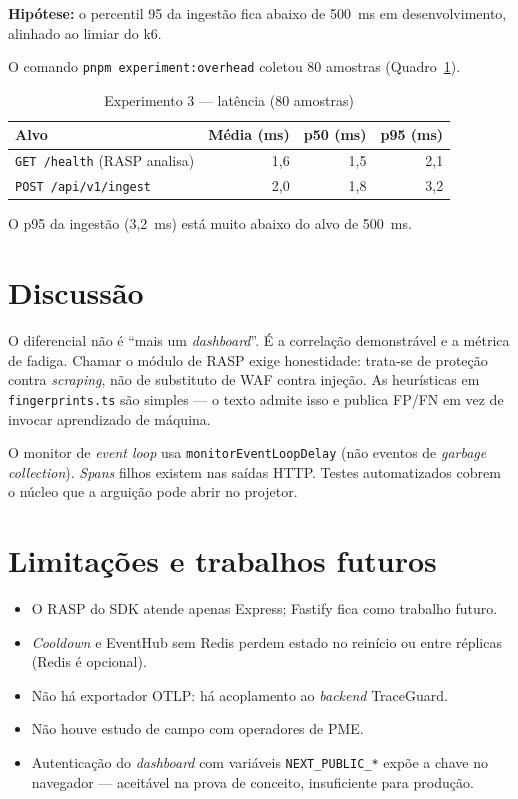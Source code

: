 \documentclass[
  12pt,
  oneside,
  a4paper,
  english,
  brazil,
  sumario=tradicional
]{abntex2}
\begin{document}
\textbf{Hipótese:} o percentil 95 da ingestão fica abaixo de 500~ms em desenvolvimento, alinhado ao limiar do k6.

O comando \texttt{pnpm experiment:overhead} coletou 80 amostras (Quadro~\ref{tab:overhead}).

\begin{table}[htbp]
\caption{Experimento 3 --- latência (80 amostras)}
\label{tab:overhead}
\centering
\begin{tabular}{@{}lrrr@{}}
\toprule
\textbf{Alvo} & \textbf{Média (ms)} & \textbf{p50 (ms)} & \textbf{p95 (ms)} \\
\midrule
\texttt{GET /health} (RASP analisa) & 1,6 & 1,5 & 2,1 \\
\texttt{POST /api/v1/ingest} & 2,0 & 1,8 & 3,2 \\
\bottomrule
\end{tabular}
\end{table}

O p95 da ingestão (3,2~ms) está muito abaixo do alvo de 500~ms.

\chapter{Discussão}

O diferencial não é ``mais um \textit{dashboard}''. É a correlação demonstrável e a métrica de fadiga. Chamar o módulo de RASP exige honestidade: trata-se de proteção contra \textit{scraping}, não de substituto de WAF contra injeção. As heurísticas em \texttt{fingerprints.ts} são simples --- o texto admite isso e publica FP/FN em vez de invocar aprendizado de máquina.

O monitor de \textit{event loop} usa \texttt{monitorEventLoopDelay} (não eventos de \textit{garbage collection}). \textit{Spans} filhos existem nas saídas HTTP. Testes automatizados cobrem o núcleo que a arguição pode abrir no projetor.

\chapter{Limitações e trabalhos futuros}

\begin{itemize}
  \item O RASP do SDK atende apenas Express; Fastify fica como trabalho futuro.
  \item \textit{Cooldown} e EventHub sem Redis perdem estado no reinício ou entre réplicas (Redis é opcional).
  \item Não há exportador OTLP: há acoplamento ao \textit{backend} TraceGuard.
  \item Não houve estudo de campo com operadores de PME.
  \item Autenticação do \textit{dashboard} com variáveis \texttt{NEXT\_PUBLIC\_*} expõe a chave no navegador --- aceitável na prova de conceito, insuficiente para produção.
\end{itemize}
\end{document}
